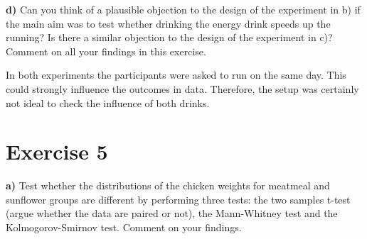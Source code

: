 \documentclass[
]{article}
\newenvironment{Shaded}{\begin{snugshade}}{\end{snugshade}}
\newcommand{\AttributeTok}[1]{\textcolor[rgb]{0.77,0.63,0.00}{#1}}
\newcommand{\CommentTok}[1]{\textcolor[rgb]{0.56,0.35,0.01}{\textit{#1}}}
\newcommand{\DecValTok}[1]{\textcolor[rgb]{0.00,0.00,0.81}{#1}}
\newcommand{\FunctionTok}[1]{\textcolor[rgb]{0.00,0.00,0.00}{#1}}
\newcommand{\NormalTok}[1]{#1}
\newcommand{\OtherTok}[1]{\textcolor[rgb]{0.56,0.35,0.01}{#1}}
\newcommand{\SpecialCharTok}[1]{\textcolor[rgb]{0.00,0.00,0.00}{#1}}
\newcommand{\StringTok}[1]{\textcolor[rgb]{0.31,0.60,0.02}{#1}}
\begin{document}
\textbf{d)} Can you think of a plausible objection to the design of the
experiment in b) if the main aim was to test whether drinking the energy
drink speeds up the running? Is there a similar objection to the design
of the experiment in c)? Comment on all your findings in this exercise.

In both experiments the participants were asked to run on the same day.
This could strongly influence the outcomes in data. Therefore, the setup
was certainly not ideal to check the influence of both drinks.

\hypertarget{exercise-5}{%
\section{Exercise 5}\label{exercise-5}}

\textbf{a)} Test whether the distributions of the chicken weights for
meatmeal and sunflower groups are different by performing three tests:
the two samples t-test (argue whether the data are paired or not), the
Mann-Whitney test and the Kolmogorov-Smirnov test. Comment on your
findings.

\begin{Shaded}
\end{Shaded}
\end{document}
